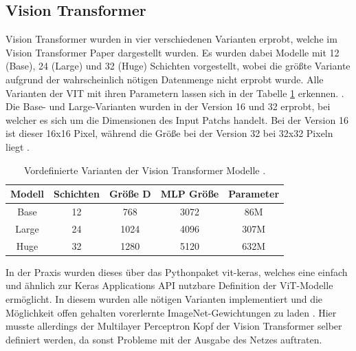 \documentclass[twoside,a4paper]{IEEEtran}
\begin{document}
\subsection{Vision Transformer} %
Vision Transformer wurden in vier verschiedenen Varianten erprobt, welche im Vision Transformer Paper dargestellt wurden. Es wurden dabei Modelle mit 12 (Base), 24 (Large) und 32 (Huge) Schichten vorgestellt, wobei die größte Variante aufgrund der wahrscheinlich nötigen Datenmenge nicht erprobt wurde. Alle Varianten der VIT mit ihren Parametern lassen sich in der Tabelle \ref{vit_sizes} erkennen. \cite[S.5]{VIT}. Die Base- und Large-Varianten wurden in der Version 16 und 32 erprobt, bei welcher es sich um die Dimensionen des Input Patchs handelt. Bei der Version 16 ist dieser 16x16 Pixel, während die Größe bei der Version 32 bei 32x32 Pixeln liegt \cite[S.5]{VIT}.
\begin{table}[!htb]
	\caption{Vordefinierte Varianten der Vision Transformer Modelle \cite[S.5]{VIT}.}
	\label{vit_sizes}
	\centering
	\begin{tabular}{|c|c|c|c|c|}
		\hline
		Modell & Schichten & Größe D & MLP Größe & Parameter\\
		\hline
		\hline
		Base & 12 & 768 & 3072 & 86M\\
		\hline
		Large & 24 & 1024 & 4096 & 307M\\
		\hline
		Huge & 32 & 1280 & 5120 & 632M\\
		\hline 
	\end{tabular}
\end{table}
In der Praxis wurden dieses über das Pythonpaket vit-keras, welches eine einfach und ähnlich zur Keras Applications API nutzbare Definition der ViT-Modelle ermöglicht. In diesem wurden alle nötigen Varianten implementiert und die Möglichkeit offen gehalten vorerlernte ImageNet-Gewichtungen zu laden \cite{git_vit}. Hier musste allerdings der Multilayer Perceptron Kopf der Vision Transformer selber definiert werden, da sonst Probleme mit der Ausgabe des Netzes auftraten.
\end{document}
